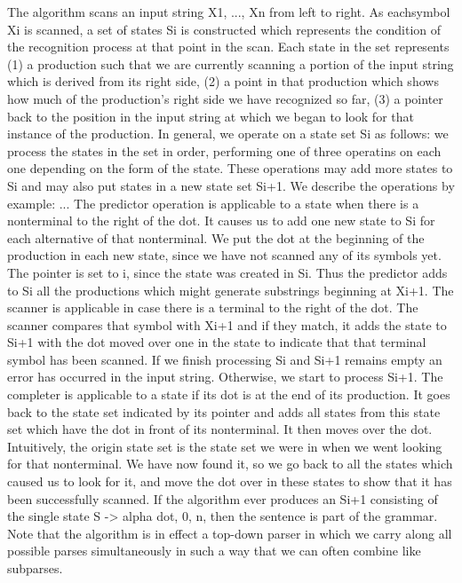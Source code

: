 \begin{isabellebody}
\begin{isamarkuptext}
The algorithm scans an input string X1, ..., Xn from left to right. As eachsymbol Xi is scanned, a set of
states Si is constructed which represents the condition of the recognition process at that point in the
scan. Each state in the set represents (1) a production such that we are currently scanning a portion of
the input string which is derived from its right side, (2) a point in that production which shows how much of the
production's right side we have recognized so far, (3) a pointer back to the position in the input string
at which we began to look for that instance of the production. In general, we operate on a state set Si as follows:
we process the states in the set in order, performing one of three operatins on each one depending on the form
of the state. These operations may add more states to Si and may also put states in a new state set Si+1. We
describe the operations by example: ... The predictor operation is applicable to a state when there is a nonterminal
to  the right of the dot. It causes us to add one new state to Si for each alternative of that nonterminal.
We put the dot at the beginning of the production in each new state, since we have not scanned any of its symbols yet.
The pointer is set to i, since the state was created in Si. Thus the predictor adds to Si all the productions
which might generate substrings beginning at Xi+1. The scanner is applicable in case there is a terminal to the right
of the dot. The scanner compares that symbol with Xi+1 and if they match, it adds the state to Si+1 with the dot
moved over one in the state to indicate that that terminal symbol has been scanned. If we finish processing Si and
Si+1 remains empty an error has occurred in the input string. Otherwise, we start to process Si+1.
The completer is applicable to a state if its dot is at the end of its production. It goes back to the state set
indicated by its pointer and adds all states from this state set which have the dot in front of its nonterminal.
It then moves over the dot. Intuitively, the origin state set is the state set we were in when we went looking
for that nonterminal. We have now found it, so we go back to all the states which caused us to look for it, and move
the dot over in these states to show that it has been successfully scanned. If the algorithm ever produces an Si+1
consisting of the single state S -> alpha dot, 0, n, then the sentence is part of the grammar. Note that the algorithm
is in effect a top-down parser in which we carry along all possible parses simultaneously in such a way that we can often
combine like subparses.%

\end{isamarkuptext}
\end{isabellebody}
